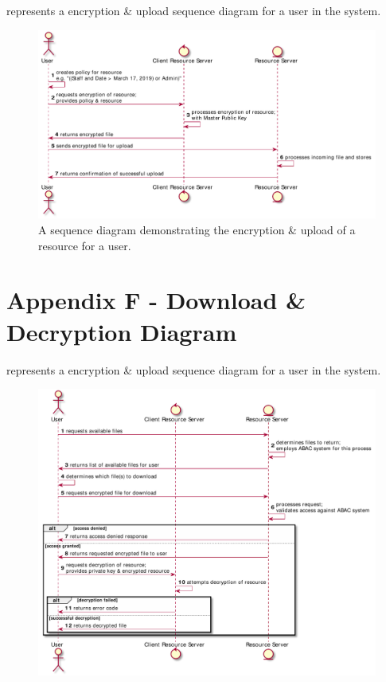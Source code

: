 \begin{appendices}
 represents a encryption \& upload sequence diagram for a user in the \theResServer system.

\begin{figure}[htp]
    \centering
    \label{fig:appendix_enc_upl}
    \includegraphics[width=\linewidth,keepaspectratio]{appendices/diagrams/flow_of_info/encryption_upload_sequence.pdf}

    \caption{A sequence diagram demonstrating the encryption \& upload of a resource for a user.}

\end{figure}

\clearpage

\section{Appendix F - Download \& Decryption Diagram}
\label{appendix:dow_dec_diagram}

 represents a encryption \& upload sequence diagram for a user in the \theResServer system.

\begin{figure}[htp]
    \centering
    \label{fig:appendix_dow_dec}
    \includegraphics[width=\linewidth,keepaspectratio]{appendices/diagrams/flow_of_info/decryption_download_sequence.pdf}


\end{figure}
\end{appendices}
